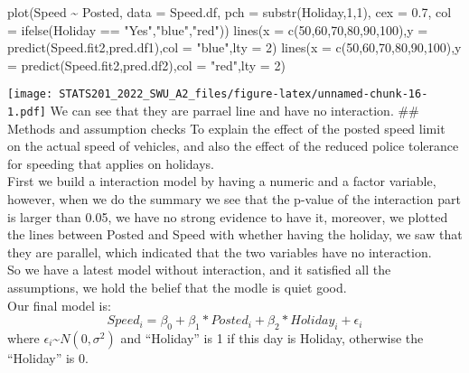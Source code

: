 \documentclass[
]{article}
\newenvironment{Shaded}{\begin{snugshade}}{\end{snugshade}}
\newcommand{\AttributeTok}[1]{\textcolor[rgb]{0.77,0.63,0.00}{#1}}
\newcommand{\DecValTok}[1]{\textcolor[rgb]{0.00,0.00,0.81}{#1}}
\newcommand{\FloatTok}[1]{\textcolor[rgb]{0.00,0.00,0.81}{#1}}
\newcommand{\FunctionTok}[1]{\textcolor[rgb]{0.00,0.00,0.00}{#1}}
\newcommand{\NormalTok}[1]{#1}
\newcommand{\SpecialCharTok}[1]{\textcolor[rgb]{0.00,0.00,0.00}{#1}}
\newcommand{\StringTok}[1]{\textcolor[rgb]{0.31,0.60,0.02}{#1}}
\begin{document}
\begin{Shaded}
\begin{Highlighting}[]
\FunctionTok{plot}\NormalTok{(Speed }\SpecialCharTok{\textasciitilde{}}\NormalTok{ Posted, }\AttributeTok{data =}\NormalTok{ Speed.df, }\AttributeTok{pch =} \FunctionTok{substr}\NormalTok{(Holiday,}\DecValTok{1}\NormalTok{,}\DecValTok{1}\NormalTok{), }\AttributeTok{cex =}
\FloatTok{0.7}\NormalTok{, }\AttributeTok{col =} \FunctionTok{ifelse}\NormalTok{(Holiday }\SpecialCharTok{==} \StringTok{"Yes"}\NormalTok{,}\StringTok{"blue"}\NormalTok{,}\StringTok{"red"}\NormalTok{))}
\FunctionTok{lines}\NormalTok{(}\AttributeTok{x =} \FunctionTok{c}\NormalTok{(}\DecValTok{50}\NormalTok{,}\DecValTok{60}\NormalTok{,}\DecValTok{70}\NormalTok{,}\DecValTok{80}\NormalTok{,}\DecValTok{90}\NormalTok{,}\DecValTok{100}\NormalTok{),}\AttributeTok{y =} \FunctionTok{predict}\NormalTok{(Speed.fit2,pred.df1),}\AttributeTok{col =}
\StringTok{"blue"}\NormalTok{,}\AttributeTok{lty =} \DecValTok{2}\NormalTok{)}
\FunctionTok{lines}\NormalTok{(}\AttributeTok{x =} \FunctionTok{c}\NormalTok{(}\DecValTok{50}\NormalTok{,}\DecValTok{60}\NormalTok{,}\DecValTok{70}\NormalTok{,}\DecValTok{80}\NormalTok{,}\DecValTok{90}\NormalTok{,}\DecValTok{100}\NormalTok{),}\AttributeTok{y =} \FunctionTok{predict}\NormalTok{(Speed.fit2,pred.df2),}\AttributeTok{col =}
\StringTok{"red"}\NormalTok{,}\AttributeTok{lty =} \DecValTok{2}\NormalTok{)}
\end{Highlighting}
\end{Shaded}

\texttt{[image: STATS201\_2022\_SWU\_A2\_files/figure-latex/unnamed-chunk-16-1.pdf]}
We can see that they are parrael line and have no interaction. \#\#
Methods and assumption checks To explain the effect of the posted speed
limit on the actual speed of vehicles, and also the effect of the
reduced police tolerance for speeding that applies on holidays.\\
First we build a interaction model by having a numeric and a factor
variable, however, when we do the summary we see that the p-value of the
interaction part is larger than 0.05, we have no strong evidence to have
it, moreover, we plotted the lines between Posted and Speed with whether
having the holiday, we saw that they are parallel, which indicated that
the two variables have no interaction.\\
So we have a latest model without interaction, and it satisfied all the
assumptions, we hold the belief that the modle is quiet good.\\
Our final model is:
\[Speed_i = \beta_0 + \beta_1 * Posted_i + \beta_2 * Holiday_i + \epsilon_i \]
where \(\epsilon_i\)\textasciitilde{}\(N(0,\sigma^2)\) and ``Holiday''
is 1 if this day is Holiday, otherwise the ``Holiday'' is 0.
\end{document}
